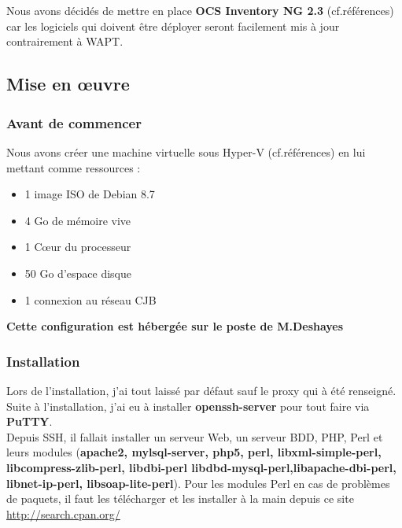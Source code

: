 \documentclass[11pt,a4paper,oneside]{article}
\begin{document}
\\ \\
Nous avons décidés de mettre en place \textbf{OCS Inventory NG 2.3} (cf.références) car les logiciels qui doivent être déployer seront facilement mis à jour contrairement à WAPT.
\\
\subsection{Mise en \oe{}uvre}
\subsubsection{Avant de commencer} 
Nous avons créer une machine virtuelle sous Hyper-V (cf.références) en lui mettant comme ressources :\\ \begin{itemize}
				\item 1 image ISO de Debian 8.7
				\item 4 Go de mémoire vive
				\item 1 C{\oe}ur du processeur
				\item 50 Go d'espace disque
				\item 1 connexion au réseau CJB	
\end{itemize} 

\begin{center}
\textbf{Cette configuration est hébergée sur le poste de M.Deshayes}
\end{center}
\newpage
\subsubsection{Installation}
Lors de l'installation, j'ai tout laissé par défaut sauf le proxy qui à été renseigné. Suite à l'installation, j'ai eu à installer \textbf{openssh-server} pour tout faire via \textbf{PuTTY}.\\

Depuis SSH, il fallait installer un serveur Web, un serveur BDD, PHP, Perl et leurs modules (\textbf{apache2, mylsql-server, php5, perl, libxml-simple-perl, libcompress-zlib-perl, libdbi-perl libdbd-mysql-perl,libapache-dbi-perl, libnet-ip-perl, libsoap-lite-perl}). Pour les modules Perl en cas de problèmes de paquets, il faut les télécharger et les installer à la main depuis ce site \url{http://search.cpan.org/} \\
\end{document}
